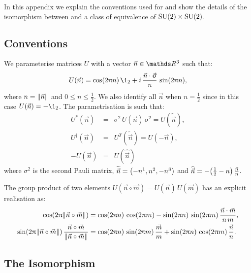 In this appendix we explain the conventions used for  and show the details of the isomorphism between  and a class of equivalence of $\mathrm{SU}(2) \times \mathrm{SU}(2)$.


\subsection{Conventions}

We parameterise  matrices $U$ with a vector $\vec{n} \in \R^3$ such that:
\begin{equation}
  U(\vec{n})
  =
  \cos(2 \pi n)\, \1_2
  +
  i\, \frac{\vec{n} \cdot \vec{\sigma}}{n}\, \sin(2 \pi n),
  \label{eq:su2parametrisation}
\end{equation}
where $n = \norm{\vec{n}}$ and $0 \le n \le \frac{1}{2}$.
We also identify all $\vec{n}$ when $n=\frac{1}{2}$ since in this case $U(\vec{n})= -\1_2$.
The parametrisation is such that:
\begin{eqnarray}
  U^*(\vec{n})
  & = &
  \sigma^2\, U(\vec{n})\, \sigma^2
  =
  U(\widetilde{\vec{n}}),
  \\
  U^{\dagger}(\vec{n})
  & = &
  U^T(\widetilde{\vec{n}})
  =
  U(-\vec{n}),
  \\
  -U(\vec{n})
  & = &
  U(\widehat{\vec{n}})
  \label{eq:U_props}
\end{eqnarray}
where $\sigma^2$ is the second Pauli matrix, $\widetilde{\vec{n}} = \qty( -n^1, n^2, -n^3 )$ and $\widehat{\vec{n}} = - \qty(\frac{1}{2} -n )\, \frac{\vec{n}}{n}$.

The group product of two elements $U(\vec{n} \circ \vec{m} ) = U(\vec{n})\,  U(\vec{m})$ has an explicit realisation as:
\begin{equation}
  \begin{split}
    \cos(2 \uppi \norm{\vec{n} \circ \vec{m}})
    & =
    \cos(2 \uppi n)\, \cos(2 \uppi m)
    -
    \sin(2 \uppi n)\, \sin(2\uppi m)\, \frac{\vec{n} \cdot \vec{m}}{n\, m},
    \\
    \sin(2 \uppi \norm{\vec{n} \circ \vec{m}})\,
    \frac{\vec{n} \circ \vec{m}}{\norm{\vec{n} \circ \vec{m}}}
    & =
    \cos(2 \uppi n)\, \sin(2\uppi m)\, \frac{\vec{m}}{m}
    +
    \sin(2 \uppi n)\, \cos(2\uppi m)\, \frac{\vec{n}}{n}.
  \end{split}
  \label{eq:product_in_SU2}
\end{equation}

\subsection{The Isomorphism}

